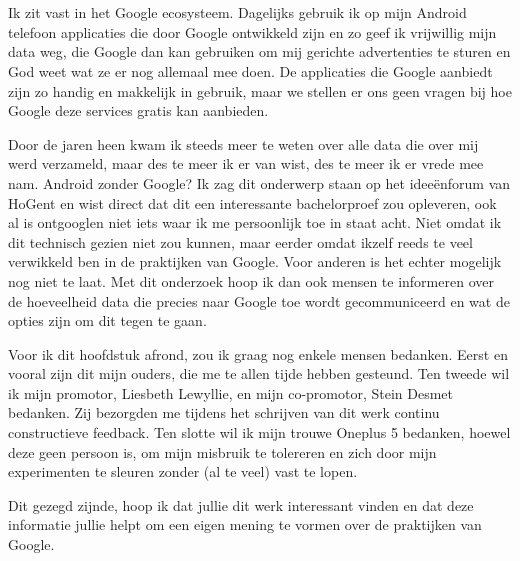 
\chapter*{}
\label{ch:voorwoord}


Ik zit vast in het Google ecosysteem. Dagelijks gebruik ik op mijn Android telefoon applicaties die door Google ontwikkeld zijn en zo geef ik vrijwillig mijn data weg, die Google dan kan gebruiken om mij gerichte advertenties te sturen en God weet wat ze er nog allemaal mee doen. De applicaties die Google aanbiedt zijn zo handig en makkelijk in gebruik, maar we stellen er ons geen vragen bij hoe Google deze services gratis kan aanbieden. 

Door de jaren heen kwam ik steeds meer te weten over alle data die over mij werd verzameld, maar des te meer ik er van wist, des te meer ik er vrede mee nam. Android zonder Google? Ik zag dit onderwerp staan op het ideeënforum van HoGent en wist direct dat dit een interessante bachelorproef zou opleveren, ook al is ontgooglen niet iets waar ik me persoonlijk toe in staat acht. Niet omdat ik dit technisch gezien niet zou kunnen, maar eerder omdat ikzelf reeds te veel verwikkeld ben in de praktijken van Google. Voor anderen is het echter mogelijk nog niet te laat. Met dit onderzoek hoop ik dan ook mensen te informeren over de hoeveelheid data die precies naar Google toe wordt gecommuniceerd en wat de opties zijn om dit tegen te gaan.

Voor ik dit hoofdstuk afrond, zou ik graag nog enkele mensen bedanken. Eerst en vooral zijn dit mijn ouders, die me te allen tijde hebben gesteund. Ten tweede wil ik mijn promotor, Liesbeth Lewyllie, en mijn co-promotor, Stein Desmet bedanken. Zij bezorgden me tijdens het schrijven van dit werk continu constructieve feedback. Ten slotte wil ik mijn trouwe Oneplus 5 bedanken, hoewel deze geen persoon is, om mijn misbruik te tolereren en zich door mijn experimenten te sleuren zonder (al te veel) vast te lopen.

Dit gezegd zijnde, hoop ik dat jullie dit werk interessant vinden en dat deze informatie jullie helpt om een eigen mening te vormen over de praktijken van Google.

